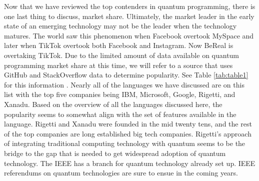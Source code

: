 \documentclass[conference]{IEEEtran}
\begin{document}
Now that we have reviewed the top contenders in quantum programming, there is one last thing to discuss, market share. 
Ultimately, the market leader in the early state of an emerging technology may not be the leader when the technology matures. 
The world saw this phenomenon when Facebook overtook MySpace and later when TikTok overtook both Facebook and Instagram. 
Now BeReal is overtaking TikTok. 
Due to the limited amount of data available on quantum programming market share at this time, we will refer to a source that uses GitHub and StackOverflow data to determine popularity. 
See Table \ref{tab:table1} for this information \cite{b16}. 
Nearly all of the languages we have discussed are on this list with the top five companies being IBM, Microsoft, Google, Rigetti, and Xanadu. 
Based on the overview of all the languages discussed here, the popularity seems to somewhat align with the set of features available in the language. 
Rigetti and Xanadu were founded in the mid twenty tens, and the rest of the top companies are long established big tech companies. 
Rigetti's approach of integrating traditional computing technology with quantum seems to be the bridge to the gap that is needed to get widespread adoption of quantum technology. 
The IEEE has a branch for quantum technology already set up. 
IEEE referendums on quantum technologies are sure to ensue in the coming years.
\end{document}
